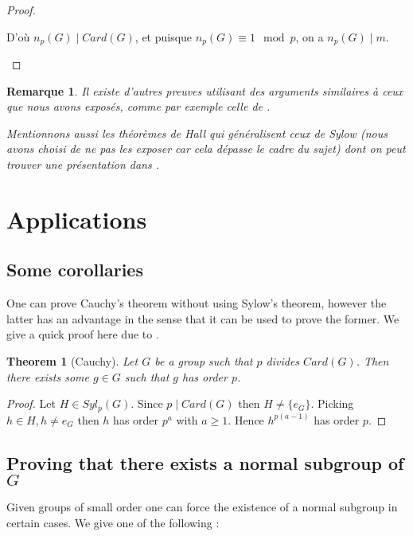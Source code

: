 \documentclass{article}
\theoremstyle{definition}
\theoremstyle{plain}
\theoremstyle{plain}
\theoremstyle{plain}
\theoremstyle{plain}
\newtheorem{remark}[subsubsection]{Remarque}
\theoremstyle{definition}
\theoremstyle{plain}
\newtheorem{thmeng}[subsubsection]{Theorem}
\theoremstyle{plain}
\begin{document}
\begin{proof}
\begin{enumerate}[label={\upshape(\roman*)}]
D'où \( n_p(G) \mid Card(G) \), et puisque \( n_p(G) \equiv 1\mod p \), on a \( n_p(G) \mid m \).
	\end{enumerate}
\end{proof}

\begin{remark}
	Il existe d'autres preuves utilisant des arguments similaires à ceux que nous avons exposés, comme par exemple celle de \cite[p.~ 140-141]{dummit2003abstract}. 

	Mentionnons aussi les théorèmes de Hall qui généralisent ceux de Sylow (nous avons choisi de ne pas les exposer car cela dépasse le cadre du sujet) dont on peut trouver une présentation dans \cite[p.~ 40-44]{serre1979ens}.
\end{remark}

\clearpage
{}
\section{Applications}

\subsection{Some corollaries}

One can prove Cauchy's theorem without using Sylow's theorem, however the latter has an advantage in the sense that it can be used to prove the former. We give a quick proof here due to \cite{serre1979ens}.

\begin{thmeng}[Cauchy]
	Let \( G \) be a group such that \( p \) divides \( Card(G) \). Then there exists some \( g \in G \) such that \( g \) has order \( p \).
\end{thmeng}

\begin{proof}
	Let \( H \in Syl_p(G) \). Since \( p \mid Card(G) \) then \( H \neq \{e_G\} \). 
	Picking \( h \in H, h \neq e_G \)
	then \( h \)  has order \( p^{a} \) with \( a \geq 1 \). 
	Hence \( h^{p(a-1)} \) has order \( p \).
\end{proof}

\subsection{Proving that there exists a normal subgroup of \ensuremath{G}}

Given groups of small order one can force the existence of a normal subgroup in certain cases. We give one of the following :
\end{document}
